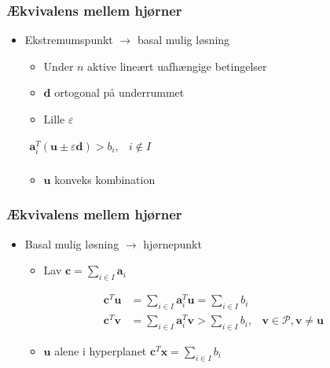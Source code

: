 %
%
\begin{frame}
\frametitle{Ækvivalens mellem hjørner}
\begin{itemize}
\item Ekstremumspunkt $\rightarrow$ basal mulig løsning
%
\begin{itemize}
\item Under $n$ aktive lineært uafhængige betingelser
\item $\textbf{d}$ ortogonal på underrummet
\item Lille $\varepsilon$
\end{itemize}

%
\centering
$
\begin{array}{ll}
\textbf{a}_i^T(\textbf{u} \pm \varepsilon \textbf{d}) > b_i, &i\notin I\\
\end{array}
$
\begin{itemize}
\item $\textbf{u}$ konveks kombination
\end{itemize}
\end{itemize}
%
\end{frame}
%
%
\begin{frame}
\frametitle{Ækvivalens mellem hjørner}
\begin{itemize}
\item Basal mulig løsning $\rightarrow$ hjørnepunkt
\begin{itemize}
\item Lav $\textbf{c} = \sum_{i\in I} \textbf{a}_i$
\end{itemize}
%
\begin{align*}
\textbf{c}^T\textbf{u} &= \sum_{i\in I} \textbf{a}_i^T\textbf{u} = 
 \sum_{i\in I} b_i\\
\textbf{c}^T\textbf{v} &= \sum_{i\in I} \textbf{a}_i^T\textbf{v} > 
 \sum_{i\in I} b_i, &\textbf{v}\in \mathcal{P}, \textbf{v} \neq \textbf{u}
\end{align*}
%
\begin{itemize}
\item $\textbf{u}$ alene i hyperplanet $\textbf{c}^T\textbf{x} = \sum_{i\in I} b_i$
\end{itemize}
\end{itemize}
\end{frame}
%
%
%
